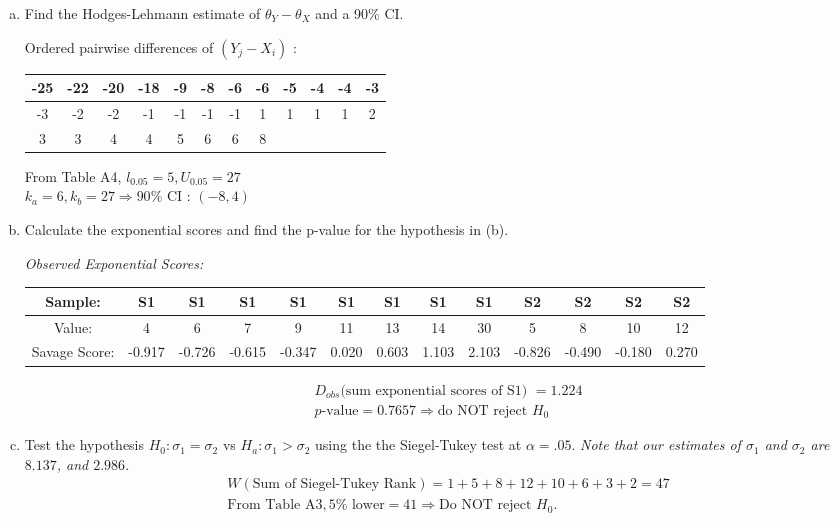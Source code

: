 \documentclass[12pt]{article}
\begin{document}
\begin{enumerate}[(a)]
\item Find the Hodges-Lehmann estimate of $\theta_Y-\theta_X$ and a 90\% CI.

Ordered pairwise differences of $(Y_j-X_i)$ : 
\begin{table}[H] \center
\begin{tabular}{|c|c|c|c|c|c|c|c|c|c|c|c|} \hline
-25 &-22& -20 &-18  &-9&  -8 & -6  &-6 & -5 & -4  &-4 & -3 \\ \hline
 -3 & -2 & -2& -1 & -1  &-1 & -1  & 1  & 1  & 1  & 1 &  2 \\ \hline
 3 & 3 &  4  & 4  & 5  & 6&6&8&&&&\\ \hline
\end{tabular}
\end{table}
From Table A4, $l_{0.05}=5, U_{0.05}=27$\\
$k_a=6, k_b=27 \Rightarrow 90\%$ CI : $(-8,4)$

\item Calculate the exponential scores and find the p-value for the hypothesis in (b).

\emph{Observed Exponential Scores: }
\begin{table}[H] \center \footnotesize
\begin{tabular}{|c|c|c|c|c|c|c|c|c|c|c|c|c|} \hline
Sample:			& S1 & S1 & S1 & S1 & S1 & S1 & S1 & S1 & S2 & S2 & S2 & S2 \\ \hline 
Value:			& 4 &  6 &  7 &  9 & 11 & 13 & 14 & 30 &  5 &  8 & 10 & 12 \\ \hline
Savage Score:	& -0.917 & -0.726 & -0.615 & -0.347 &  0.020 &  0.603 &  1.103 &  2.103 & -0.826 & -0.490 & -0.180 &  0.270 \\ \hline
\end{tabular}
\end{table}

\vspace{-3em}
\begin{align*}
& D_{obs} \text{(sum exponential scores of S1) } = 1.224 \\
& p\text{-value} = 0.7657 \Rightarrow \text{do NOT reject } H_0
\end{align*}

\item Test the hypothesis $H_0:\sigma_1=\sigma_2$ vs $H_a:\sigma_1>\sigma_2$ using the the Siegel-Tukey test at $\alpha=.05$.
\emph{Note that our estimates of $\sigma_1$ and $\sigma_2$ are $8.137$, and $2.986$.}
\begin{align*}
& W(\text{Sum of Siegel-Tukey Rank}) = 1+5+8+12+10+6+3+2 = 47 \\
& \text{From Table A3}, 5\% \text{ lower} = 41 \Rightarrow \text{Do NOT reject } H_0. \\
\end{align*}


\end{enumerate}
\end{document}
